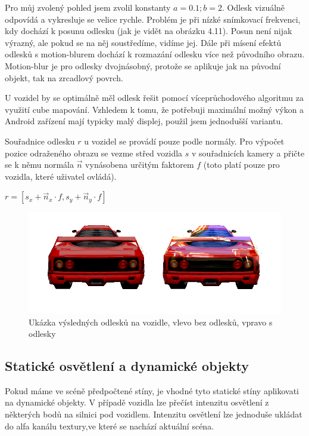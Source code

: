 \documentclass[11pt,twoside,a4paper]{book}
\begin{document}
Pro můj zvolený pohled jsem zvolil konstanty $a = 0.1; b = 2$. Odlesk vizuálně odpovídá a vykresluje se velice rychle. Problém je při nízké snímkovací frekvenci, kdy dochází k posunu odlesku (jak je vidět na obrázku 4.11). Posun není nijak výrazný, ale pokud se na něj soustředíme, vidíme jej. Dále při mísení efektů odlesků s motion-blurem dochází k rozmazání odlesku více než původního obrazu. Motion-blur je pro odlesky dvojnásobný, protože se aplikuje jak na původní objekt, tak na zrcadlový povrch.
\bigskip

U vozidel by se optimálně měl odlesk řešit pomocí víceprůchodového algoritmu za využití cube mapování. Vzhledem k tomu, že potřebuji maximální možný výkon a Android zařízení mají typicky malý displej, použil jsem jednodušší variantu.

Souřadnice odlesku $r$ u vozidel se provádí pouze podle normály. Pro výpočet pozice odraženého obrazu se vezme střed vozidla $s$ v souřadnicích kamery a přičte se k němu normála $\vec{n}$ vynásobena určitým faktorem $f$ (toto platí pouze pro vozidla, které uživatel ovládá).
\begin{center}
$r = [s_x + \vec{n}_x \cdot f, s_y + \vec{n}_y \cdot f]$
\end{center}

\begin{center}
\begin{figure}[h!]
\includegraphics[width=150mm]{figures/reflect-car.png}
\caption{Ukázka výsledných odlesků na vozidle, vlevo bez odlesků, vpravo s odlesky}
\end{figure}
\end{center}

\subsection{Statické osvětlení a dynamické objekty}

Pokud máme ve scéně předpočtené stíny, je vhodné tyto statické stíny aplikovat\linebreak i na dynamické objekty. V případě vozidla lze přečíst intenzitu osvětlení z některých bodů na silnici pod vozidlem. Intenzitu osvětlení lze jednoduše ukládat do alfa kanálu textury,\linebreak ve které se nachází aktuální scéna.
\end{document}
